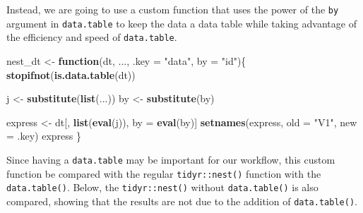 \documentclass[doc]{apa6}
\newenvironment{Shaded}{\begin{snugshade}}{\end{snugshade}}
\newcommand{\ControlFlowTok}[1]{\textcolor[rgb]{0.13,0.29,0.53}{\textbf{#1}}}
\newcommand{\DataTypeTok}[1]{\textcolor[rgb]{0.13,0.29,0.53}{#1}}
\newcommand{\KeywordTok}[1]{\textcolor[rgb]{0.13,0.29,0.53}{\textbf{#1}}}
\newcommand{\NormalTok}[1]{#1}
\newcommand{\OperatorTok}[1]{\textcolor[rgb]{0.81,0.36,0.00}{\textbf{#1}}}
\newcommand{\StringTok}[1]{\textcolor[rgb]{0.31,0.60,0.02}{#1}}
\begin{document}
\begin{Shaded}
\end{Shaded}

\noindent Instead, we are going to use a custom function that uses the power of the \texttt{by} argument in \texttt{data.table} to keep the data a data table while taking advantage of the efficiency and speed of \texttt{data.table}.

\begin{Shaded}
\begin{Highlighting}[]
\NormalTok{nest_dt <-}\StringTok{ }\ControlFlowTok{function}\NormalTok{(dt, ..., }\DataTypeTok{.key =} \StringTok{"data"}\NormalTok{, }\DataTypeTok{by =} \StringTok{"id"}\NormalTok{)\{}
  \KeywordTok{stopifnot}\NormalTok{(}\KeywordTok{is.data.table}\NormalTok{(dt))}
  
\NormalTok{  j <-}\StringTok{ }\KeywordTok{substitute}\NormalTok{(}\KeywordTok{list}\NormalTok{(...))}
\NormalTok{  by <-}\StringTok{ }\KeywordTok{substitute}\NormalTok{(by)}
  
\NormalTok{  express <-}\StringTok{ }\NormalTok{dt[, }\KeywordTok{list}\NormalTok{(}\KeywordTok{eval}\NormalTok{(j)), by =}\StringTok{ }\KeywordTok{eval}\NormalTok{(by)]}
  \KeywordTok{setnames}\NormalTok{(express, }\DataTypeTok{old =} \StringTok{"V1"}\NormalTok{, }\DataTypeTok{new =}\NormalTok{ .key)}
\NormalTok{  express}
\NormalTok{\}}
\end{Highlighting}
\end{Shaded}

Since having a \texttt{data.table} may be important for our workflow, this custom function be compared with the regular \texttt{tidyr::nest()} function with the \texttt{data.table()}. Below, the \texttt{tidyr::nest()} without \texttt{data.table()} is also compared, showing that the results are not due to the addition of \texttt{data.table()}.

\begin{Shaded}
\end{Shaded}
\end{document}
